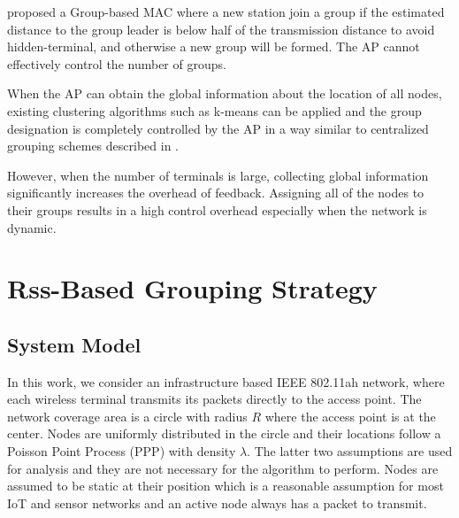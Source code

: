 \cite{abichar2013group} proposed a Group-based MAC where a new station join a group if the estimated distance to the group leader is below half of the transmission distance to avoid hidden-terminal, and otherwise a new group will be formed. The AP cannot effectively control the number of groups.

When the AP can obtain the global information about the location of all nodes, existing clustering algorithms such as k-means can be applied and the group designation is completely controlled by the AP in a way similar to centralized grouping schemes described in \cite{zheng2014performance}.

However, when the number of terminals is large, collecting global information significantly increases the overhead of feedback. Assigning all of the nodes to their groups results in a high control overhead especially when the network is dynamic.

\section{Rss-Based Grouping Strategy}


\subsection{System Model} \label{single:systemmodel}

In this work, we consider an infrastructure based IEEE 802.11ah network, where each wireless terminal transmits its packets directly to the access point. %
The network coverage area is a circle with radius $R$ where the access point is at the center. Nodes are uniformly distributed in the circle and their locations follow a Poisson Point Process (PPP) with density $\lambda$. The latter two assumptions are used for analysis and they are not necessary for the algorithm to perform. Nodes are assumed to be static at their position which is a reasonable assumption for most IoT and sensor networks and an active node always has a packet to transmit. %


